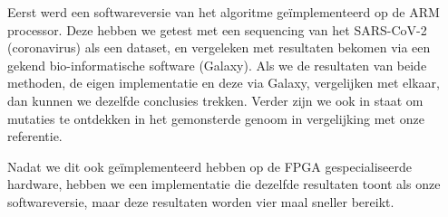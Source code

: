 Eerst werd een softwareversie van het algoritme ge\"implementeerd op de ARM processor. Deze hebben we getest met een sequencing van het SARS-CoV-2 (coronavirus) als een dataset, en vergeleken met resultaten bekomen via een gekend bio-informatische software (Galaxy). Als we de resultaten van beide methoden, de eigen implementatie en deze via Galaxy, vergelijken met elkaar, dan kunnen we dezelfde conclusies trekken. Verder zijn we ook in staat om mutaties te ontdekken in het gemonsterde genoom in vergelijking met onze referentie.

Nadat we dit ook ge\"implementeerd hebben op de FPGA gespecialiseerde hardware, hebben we een implementatie die dezelfde resultaten toont als onze softwareversie, maar deze resultaten worden vier maal sneller bereikt.